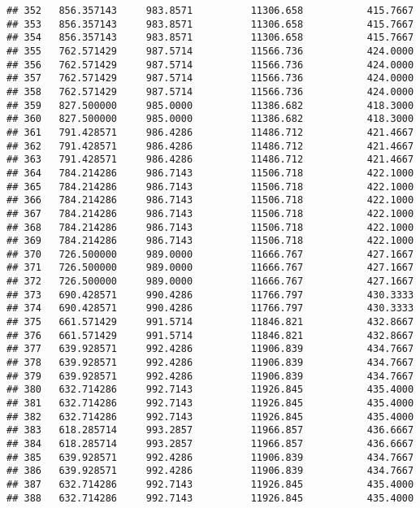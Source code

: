 \documentclass[]{article}
\begin{document}
\begin{verbatim}
## 352   856.357143     983.8571          11306.658           415.7667
## 353   856.357143     983.8571          11306.658           415.7667
## 354   856.357143     983.8571          11306.658           415.7667
## 355   762.571429     987.5714          11566.736           424.0000
## 356   762.571429     987.5714          11566.736           424.0000
## 357   762.571429     987.5714          11566.736           424.0000
## 358   762.571429     987.5714          11566.736           424.0000
## 359   827.500000     985.0000          11386.682           418.3000
## 360   827.500000     985.0000          11386.682           418.3000
## 361   791.428571     986.4286          11486.712           421.4667
## 362   791.428571     986.4286          11486.712           421.4667
## 363   791.428571     986.4286          11486.712           421.4667
## 364   784.214286     986.7143          11506.718           422.1000
## 365   784.214286     986.7143          11506.718           422.1000
## 366   784.214286     986.7143          11506.718           422.1000
## 367   784.214286     986.7143          11506.718           422.1000
## 368   784.214286     986.7143          11506.718           422.1000
## 369   784.214286     986.7143          11506.718           422.1000
## 370   726.500000     989.0000          11666.767           427.1667
## 371   726.500000     989.0000          11666.767           427.1667
## 372   726.500000     989.0000          11666.767           427.1667
## 373   690.428571     990.4286          11766.797           430.3333
## 374   690.428571     990.4286          11766.797           430.3333
## 375   661.571429     991.5714          11846.821           432.8667
## 376   661.571429     991.5714          11846.821           432.8667
## 377   639.928571     992.4286          11906.839           434.7667
## 378   639.928571     992.4286          11906.839           434.7667
## 379   639.928571     992.4286          11906.839           434.7667
## 380   632.714286     992.7143          11926.845           435.4000
## 381   632.714286     992.7143          11926.845           435.4000
## 382   632.714286     992.7143          11926.845           435.4000
## 383   618.285714     993.2857          11966.857           436.6667
## 384   618.285714     993.2857          11966.857           436.6667
## 385   639.928571     992.4286          11906.839           434.7667
## 386   639.928571     992.4286          11906.839           434.7667
## 387   632.714286     992.7143          11926.845           435.4000
## 388   632.714286     992.7143          11926.845           435.4000

\end{verbatim}
\end{document}
